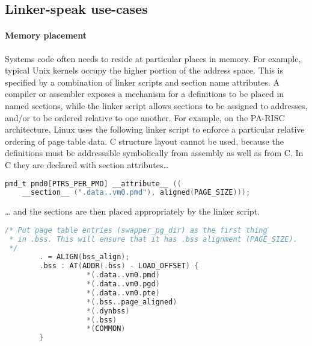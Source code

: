 

\subsection{Linker-speak use-cases}

\paragraph{Memory placement}
Systems code often needs to reside at particular places in memory.
For example, typical Unix kernels occupy the higher portion of the address space.
This is specified by a combination of linker scripts and section name attributes. 
A compiler or assembler exposes a mechanism for a definitions to be placed in named sections,
while the linker script allows sections to be assigned to addresses, 
and/or to be ordered relative to one another.
For example, on the PA-RISC architecture, Linux uses the following 
linker script to enforce a particular relative ordering of page table data.
C structure layout cannot be used, because the definitions must be addressable
symbolically from assembly as well as from C.
In C they are declared with section attributes\ldots{}

{\scriptsize\begin{lstlisting}[language=C,columns=flexible,basicstyle=\sffamily]
pmd_t pmd0[PTRS_PER_PMD] __attribute__ ((
    __section__ (".data..vm0.pmd"), aligned(PAGE_SIZE)));
\end{lstlisting}}

\ldots{} and the sections are then placed appropriately by the linker script.

{\scriptsize\begin{lstlisting}[language=C,columns=flexible,basicstyle=\sffamily]
/* Put page table entries (swapper_pg_dir) as the first thing 
 * in .bss. This will ensure that it has .bss alignment (PAGE_SIZE).
 */
        . = ALIGN(bss_align);                
        .bss : AT(ADDR(.bss) - LOAD_OFFSET) {
                   *(.data..vm0.pmd)
                   *(.data..vm0.pgd)
                   *(.data..vm0.pte)
                   *(.bss..page_aligned)     
                   *(.dynbss)                
                   *(.bss)                   
                   *(COMMON)                 
        }
\end{lstlisting}}

